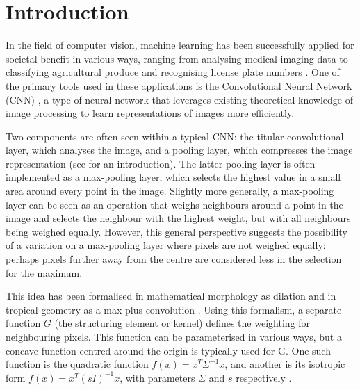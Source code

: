 \documentclass[a4paper, 12pt]{report}
\begin{document}
\newpage



\setcounter{page}{1}
\pagestyle{plain} 

\chapter{Introduction}
In the field of computer vision, machine learning has been successfully applied for societal benefit in various ways, ranging from analysing medical imaging data \cite{esteva2021deep, jain2015computer} to classifying agricultural produce \cite{wan2020faster, sivaranjani2022overview} and recognising license plate numbers \cite{xie2018new}. One of the primary tools used in these applications is the Convolutional Neural Network (CNN) \cite{le1990handwritten}, a type of neural network that leverages existing theoretical knowledge of image processing to learn representations of images more efficiently.

Two components are often seen within a typical CNN: the titular convolutional layer, which analyses the image, and a pooling layer, which compresses the image representation (see \cite{introconvnets} for an introduction). The latter pooling layer is often implemented as a max-pooling layer, which selects the highest value in a small area around every point in the image. Slightly more generally, a max-pooling layer can be seen as an operation that weighs neighbours around a point in the image and selects the neighbour with the highest weight, but with all neighbours being weighed equally. However, this general perspective suggests the possibility of a variation on a max-pooling layer where pixels are not weighed equally: perhaps pixels further away from the centre are considered less in the selection for the maximum.

This idea has been formalised in mathematical morphology as dilation \cite{heijmans1996morphological} and in tropical geometry as a max-plus convolution \cite{maragos}. Using this formalism, a separate function $G$ (the structuring element or kernel) defines the weighting for neighbouring pixels. This function can be parameterised in various ways, but a concave function centred around the origin is typically used for G. One such function is the quadratic function $f(x)=x^T\Sigma^{-1}x$, and another is its isotropic form $f(x)=x^T(sI)^{-1}x$, with parameters $\Sigma$ and $s$ respectively \cite{Boomgaard1999NumericalSS}.
\end{document}
